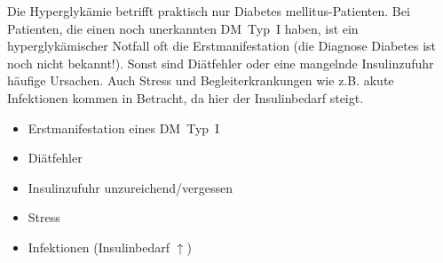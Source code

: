 {
Die Hyperglykämie betrifft praktisch nur Diabetes mellitus-Patienten. Bei
Patienten, die einen noch unerkannten DM~Typ~I haben, ist ein hyperglykämischer
Notfall oft die Erstmanifestation (die Diagnose Diabetes ist noch nicht
bekannt!). Sonst sind Diätfehler oder eine mangelnde Insulinzufuhr häufige
Ursachen. Auch Stress und Begleiterkrankungen wie z.B. akute Infektionen
kommen in Betracht, da hier der Insulinbedarf steigt.
}{
\begin{itemize}
  \item Erstmanifestation eines DM~Typ~I
  \item Diätfehler
  \item Insulinzufuhr unzureichend/vergessen
  \item Stress
  \item Infektionen (Insulinbedarf ${\uparrow}$)
\end{itemize}
}{}{}{}









